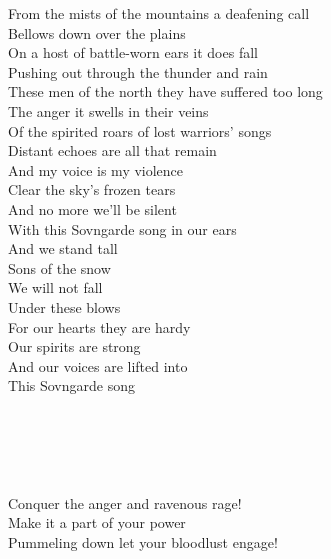 
From the mists of the mountains a deafening call \\
Bellows down over the plains \tab{}\tab{}\\
On a host of battle-worn ears it does fall \tab{}\\
Pushing out through the thunder and rain \tab{}\\
These men of the north they have suffered too long \\
The anger it swells in their veins \tab{}\\
Of the spirited roars of lost warriors' songs \tab{}\\
Distant echoes are all that remain \tab{}\\
\hops
{} And my voice is my violence \\
 Clear the sky's frozen tears  \\
 And no more we'll be silent \\
 With this Sovngarde song in our ears \\
\hop
{} {} And we stand tall  \tab{}\\
 {} Sons of the snow \tab{}\\
 {} We will not fall \tab{}\\
 {} Under these blows \tab{}\\
 {} For our hearts they are hardy \\
 {} Our spirits are strong \\
 {} And our voices are lifted into \\
 {} This Sovngarde song  \\
\hops
\tab{}\tab{}\\
\tab{}\tab{}\\
\tab{}\tab{}\\
\tab{}\tab{}\\
\tab{}\tab{}\\
\hops
Conquer the anger and ravenous rage! \\
Make it a part of your power \tab{}\\
Pummeling down let your bloodlust engage! \\
